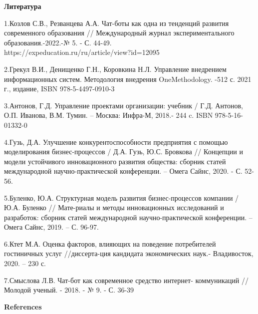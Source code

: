 \begin{center}
  {\bfseries Литература}
  \end{center}

\begin{noparindent}

1.Козлов С.В., Резванцева А.А. Чат-боты как одна из тенденций развития
современного образования // Международный журнал экспериментального
образования.-2022.-№ 5. - С. 44-49.
\\https://expeducation.ru/ru/article/view?id=12095~

2.Грекул В.И., Денищенко Г.Н., Коровкина Н.Л. Управление внедрением
информационных систем. Методология внедрения OneMethodology. -512 с.
2021 г., издание, ISBN 978-5-4497-0910-3

3.Антонов, Г.Д. Управление проектами организации: учебник / Г.Д.
Антонов, О.П. Иванова, В.М. Тумин. -- Москва: Инфра-М, 2018.- 244 c.
ISBN 978-5-16-01332-0

4.Гузь, Д.А. Улучшение конкурентоспособности предприятия с помощью
моделирования бизнес-процессов / Д.А. Гузь, Ю.С. Бровкова // Концепции и
модели устойчивого инновационного развития общества: сборник статей
международной научно-практической конференции. -- Омега Сайнс, 2020. -
С. 52-56.

5.Буленко, Ю.А. Структурная модель развития бизнес-процессов компании /
Ю.А. Буленко // Мате-риалы и методы инновационных исследований и
разработок: сборник статей международной научно-практической
конференции. -- Омега Сайнс, 2019. -- С. 96-97.

6.Ктет М.А. Оценка факторов, влияющих на поведение потребителей
гостиничных услуг //диссерта-ция кандидата экономических наук.-
Владивосток, 2020. -- 230 с.

7.Смыслова Л.В. Чат-бот как современное средство интернет- коммуникаций
// Молодой ученый. - 2018. - № 9. - С. 36-39
\end{noparindent}

\begin{center}
  {\bfseries References}
  \end{center}


